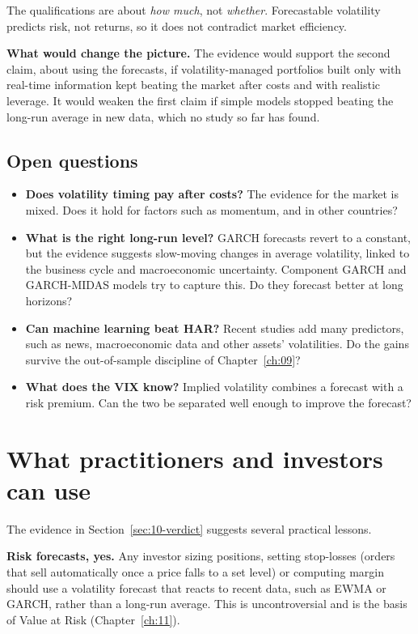 The qualifications are about \emph{how much}, not \emph{whether}. Forecastable volatility predicts risk, not returns, so it does not contradict market efficiency.

\textbf{What would change the picture.} The evidence would support the second claim, about using the forecasts, if volatility-managed portfolios built only with real-time information kept beating the market after costs and with realistic leverage. It would weaken the first claim if simple models stopped beating the long-run average in new data, which no study so far has found.

\subsection{Open questions}
\label{sec:10-open}

\begin{itemize}
  \item \textbf{Does volatility timing pay after costs?} The evidence for the market is mixed. Does it hold for factors such as momentum, and in other countries?
  \item \textbf{What is the right long-run level?} GARCH forecasts revert to a constant, but the evidence suggests slow-moving changes in average volatility, linked to the business cycle and macroeconomic uncertainty. Component GARCH and GARCH-MIDAS models try to capture this. Do they forecast better at long horizons?
  \item \textbf{Can machine learning beat HAR?} Recent studies add many predictors, such as news, macroeconomic data and other assets' volatilities. Do the gains survive the out-of-sample discipline of Chapter~\ref{ch:09}?
  \item \textbf{What does the VIX know?} Implied volatility combines a forecast with a risk premium. Can the two be separated well enough to improve the forecast?
\end{itemize}

\section{What practitioners and investors can use}
\label{sec:10-investors}

The evidence in Section~\ref{sec:10-verdict} suggests several practical lessons.

\textbf{Risk forecasts, yes.} Any investor sizing positions, setting stop-losses (orders that sell automatically once a price falls to a set level) or computing margin should use a volatility forecast that reacts to recent data, such as EWMA or GARCH, rather than a long-run average. This is uncontroversial and is the basis of Value at Risk (Chapter~\ref{ch:11}).

